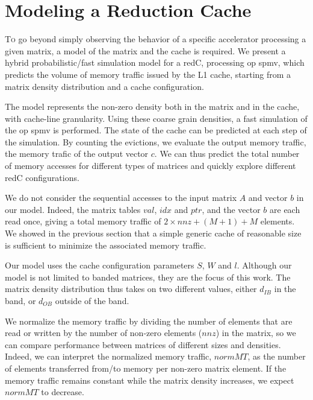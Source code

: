 
\section{Modeling a Reduction Cache}
\label{sec:theory:cmodel}

\lettrine{T}{o} go beyond simply observing the behavior of a specific accelerator processing a given matrix, a model of the matrix and the cache is required.
We present a hybrid probabilistic/fast simulation model for a \gls{redC}, processing \acrshort{op} \acrshort{spmv}, which predicts the volume of memory traffic issued by the L1 cache, starting from a matrix density distribution and a cache configuration.

The model represents the non-zero density both in the matrix and in the cache, with cache-line granularity.
Using these coarse grain densities, a fast simulation of the \acrshort{op} \acrshort{spmv} is performed.
The state of the cache can be predicted at each step of the simulation.
By counting the \glspl{eviction}, we evaluate the output memory traffic, the memory trafic of the output vector $c$.
We can thus predict the total number of memory accesses for different types of matrices and quickly explore different \gls{redC} configurations.

We do not consider the sequential accesses to the input matrix $A$ and vector $b$ in our model.
Indeed, the matrix tables $\mathit{val}$, $\mathit{idx}$ and $\mathit{ptr}$, and the vector $b$ are each read once, giving a total memory traffic of $2 \times \mathit{nnz} + (M+1) + M$ elements.
We showed in the previous section that a simple generic cache of reasonable size is sufficient to minimize the associated memory traffic.

Our model uses the cache configuration parameters $S$, $W$ and $l$.
Although our model is not limited to \gls{banded} matrices, they are the focus of this work.
The matrix density distribution thus takes on two different values, either $d_\mathit{IB}$ in the band, or $d_\mathit{OB}$ outside of the band.

We normalize the memory traffic by dividing the number of elements that are read or written by the number of non-zero elements ($\mathit{nnz}$) in the matrix, so we can compare performance between matrices of different sizes and densities.
Indeed, we can interpret the normalized memory traffic, $\mathit{normMT}$, as the number of elements transferred from/to memory per non-zero matrix element.
If the memory traffic remains constant while the matrix density increases, we expect $\mathit{normMT}$ to decrease.

